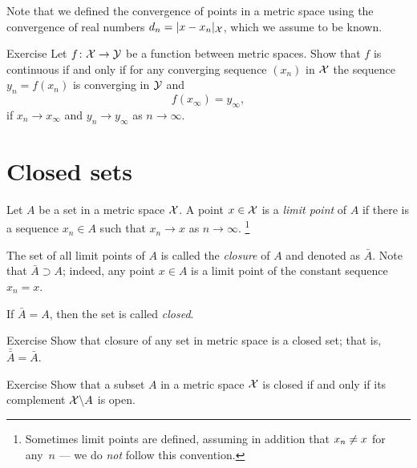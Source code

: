 Note that we defined the convergence of points in a metric space using the convergence of real numbers $d_n=|x-x_n|_{\mathcal{X}}$, which we assume to be known.

\begin{thm}{Exercise}
Let $f\colon\mathcal{X}\to\mathcal{Y}$ be a function between metric spaces.
Show that $f$ is continuous if and only if for any converging sequence $(x_n)$ in $\mathcal{X}$ the sequence $y_n=f(x_n)$ is converging in $\mathcal{Y}$ and 
\[f( x_\infty)= y_\infty,\]
if
$x_n\to x_\infty$ and $y_n\to y_\infty$ as $n\to\infty$.

\end{thm}


\section{Closed sets}

Let $A$ be a set in a metric space $\mathcal{X}$.
A point $x\in \mathcal{X}$ is a \emph{limit point} of $A$ if there is a sequence $x_n\in A$ such that $x_n\to x$ as $n\to\infty$.%
\footnote{Sometimes limit points are defined, assuming in addition that $x_n\z\ne x$ for any~$n$ --- we do \emph{not} follow this convention.}

The set of all limit points of $A$ is called the \emph{closure} of $A$ and denoted as $\bar A$.
Note that $\bar A\supset A$;
indeed, any point $x\in A$ is a limit point of the constant sequence $x_n=x$.

If $\bar A= A$, then the set is called \emph{closed}.

\begin{thm}{Exercise}
Show that closure of any set in metric space is a closed set;
that is, $\bar{\bar A}= \bar A$.
\end{thm}

\begin{thm}{Exercise}
Show that a subset $A$ in a metric space $\mathcal{X}$ is closed if and only if its complement $\mathcal{X}\backslash A$ is open.
\end{thm}



